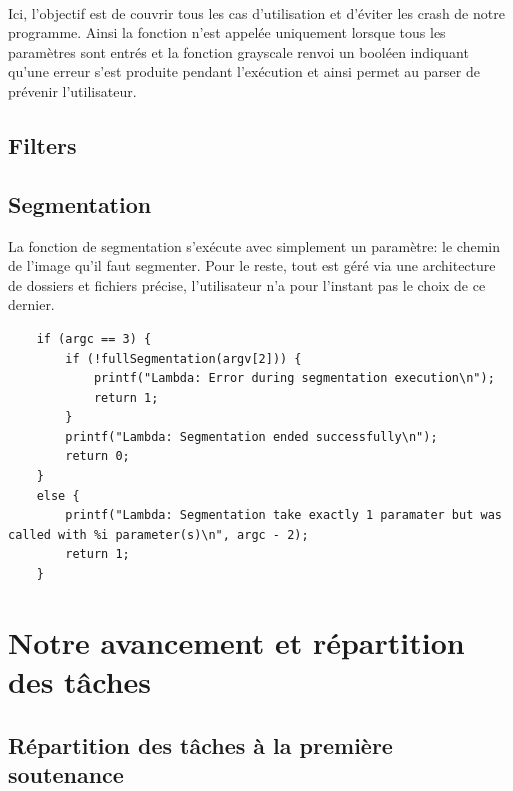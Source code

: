 \documentclass{article}
\begin{document}
\paragraph{}Ici, l'objectif est de couvrir tous les cas d'utilisation et d'éviter les crash de notre programme. Ainsi la fonction n'est appelée uniquement lorsque tous les paramètres sont entrés et la fonction grayscale renvoi un booléen indiquant qu'une erreur s'est produite pendant l'exécution et ainsi permet au parser de prévenir l'utilisateur.

\subsection{Filters}

\subsection{Segmentation}

La fonction de segmentation s'exécute avec simplement un paramètre: le chemin de l'image qu'il faut segmenter. Pour le reste, tout est géré via une architecture de dossiers et fichiers précise, l'utilisateur n'a pour l'instant pas le choix de ce dernier.

\begin{lstlisting}
	if (argc == 3) {
		if (!fullSegmentation(argv[2])) {
			printf("Lambda: Error during segmentation execution\n");
			return 1;
		}
		printf("Lambda: Segmentation ended successfully\n");
		return 0;
	}
	else {
		printf("Lambda: Segmentation take exactly 1 paramater but was called with %i parameter(s)\n", argc - 2);
		return 1;
	}
\end{lstlisting}

\newpage
{}
\section{Notre avancement et répartition des tâches}


\subsection{Répartition des tâches à la première soutenance}
\end{document}

